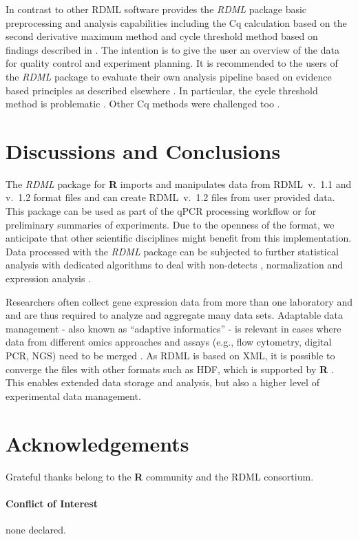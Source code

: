 \documentclass{bioinfo}
\begin{document}
In contrast to other RDML software provides the \textit{RDML} package basic 
preprocessing and analysis capabilities including the Cq calculation based on 
the second derivative maximum method and cycle threshold method based on 
findings described in \cite{roediger_RJ_2013, roediger2015chippcr, 
spiess_impact_2014, spiess_system-specific_2016}. The intention is to give the 
user an overview of the data for quality control and experiment planning. It 
is recommended to the users of the \textit{RDML} package to evaluate their own 
analysis pipeline based on evidence based principles as described elsewhere 
\cite{ritz_qpcr_2008, roediger2015r}. In particular, the cycle threshold method 
is problematic \cite{spiess_impact_2014, spiess_system-specific_2016}. Other Cq 
methods were challenged too \cite{ruijter_evaluation_2013}.

\section{Discussions and Conclusions}

The \textit{RDML} package for \textbf{R} imports and manipulates data 
from RDML~v.~1.1 and v.~1.2 format files and can create RDML~v.~1.2 files 
from user provided data. This package can be used as part of the qPCR 
processing workflow or for preliminary summaries of experiments. Due to the 
openness of the format, we anticipate that other scientific disciplines might 
benefit from this implementation. Data processed with the \textit{RDML} package 
can be subjected to further statistical analysis with dedicated algorithms to 
deal with non-detects \cite{mccall_non-detects_2014}, normalization 
\cite{perkins_readqpcr_2012} and expression analysis \cite{dvinge_htqpcr:_2009, matz_no_2013}.

Researchers often collect gene expression data from more than one laboratory and 
and are thus required to analyze and aggregate many data sets. Adaptable data 
management - also known as “adaptive informatics” - is relevant in cases where 
data from different omics approaches and assays (e.g., flow cytometry, digital 
PCR, NGS) need to be merged \cite{baker_quantitative_2012}. As RDML is based on 
XML, it is possible to converge the files with other formats such as HDF, 
\cite{millard_adaptive_2011} which is supported by \textbf{R} 
\cite{Fischer_HDF5}. This enables extended data storage and analysis, but also a 
higher level of experimental data management.

\section{Acknowledgements}
Grateful thanks belong to the \textbf{R} community and the RDML consortium.
\paragraph{Conflict of Interest\textcolon} none declared.

%
%
%
%
%
%

%

\end{document}
